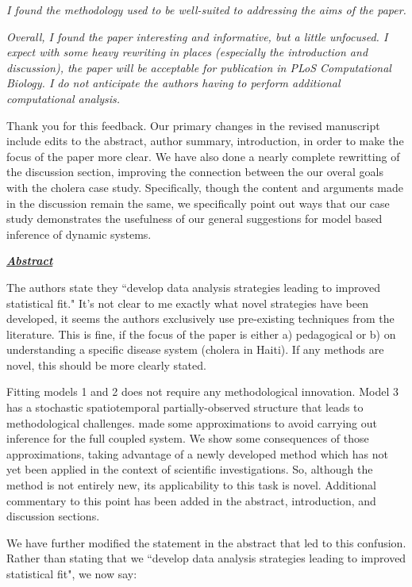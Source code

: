 \documentclass[11pt]{article}
\newcommand\report[1]{{\color{mygreen} \vspace{1mm}\hspace{0.25in}\parbox{6in}{\em #1}}}
\begin{document}
\report{
  I found the methodology used to be well-suited to addressing the aims of the paper.
}

\report{
  Overall, I found the paper interesting and informative, but a little unfocused. I expect with some heavy rewriting in places (especially the introduction and discussion), the paper will be acceptable for publication in PLoS Computational Biology. I do not anticipate the authors having to perform additional computational analysis.
}

Thank you for this feedback.
Our primary changes in the revised manuscript include edits to the abstract, author summary, introduction, in order to make the focus of the paper more clear.
We have also done a nearly complete rewritting of the discussion section, improving the connection between the our overal goals with the cholera case study. 
Specifically, though the content and arguments made in the discussion remain the same, we specifically point out ways that our case study demonstrates the usefulness of our general suggestions for model based inference of dynamic systems.

\report{
  \textbf{\underline{Abstract}}

  The authors state they ``develop data analysis strategies leading to improved statistical fit." It's not clear to me exactly what novel strategies have been developed, it seems the authors exclusively use pre-existing techniques from the literature. This is fine, if the focus of the paper is either a) pedagogical or b) on understanding a specific disease system (cholera in Haiti). If any methods are novel, this should be more clearly stated.
}

Fitting models 1 and 2 does not require any methodological innovation. Model 3 has a stochastic spatiotemporal partially-observed structure that leads to methodological challenges. \cite{lee20} made some approximations to avoid carrying out inference for the full coupled system. We show some consequences of those approximations, taking advantage of a newly developed method which has not yet been applied in the context of scientific investigations. So, although the method is not entirely new, its applicability to this task is novel.
Additional commentary to this point has been added in the abstract, introduction, and discussion sections.

We have further modified the statement in the abstract that led to this confusion. Rather than stating that we ``develop data analysis strategies leading to improved statistical fit", we now say:
\end{document}
